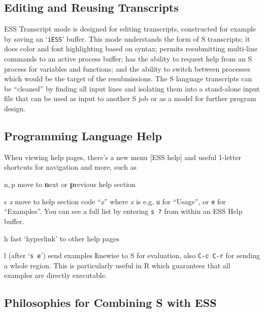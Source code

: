 \documentclass{article}
\newcommand{\stexttt}[1]{{\small\texttt{#1}}}
\newcommand{\file}[1]{`\stexttt{#1}'}
\begin{document}
\subsection{Editing and Reusing Transcripts}
\label{sec:S:trans}

ESS Transcript mode is designed for editing transcripts, constructed for
example by saving an \file{iESS} buffer.  This mode understands the form
of S transcripts; it does color and font highlighting based on syntax;
permits resubmitting multi-line commands to an active process buffer;
has the ability to request help from an S process for variables and
functions; and the ability to switch between processes which would be
the target of the resubmissions.  The S language transcripts can be
``cleaned'' by finding all input lines and isolating them into a
stand-alone input file that can be used as input to another S job or as
a model for further program design.

\subsection{Programming Language Help}
\label{sec:S:help}

When viewing help pages, there's a new menu \textsf{[ESS help]} and
useful 1-letter shortcuts for navigation and more, such as
\begin{list}{}{\renewcommand{\makelabel}[1]{\bf#1\hfill}}
 \item[n,\,p] move to \textbf{n}ext or \textbf{p}revious help section
 \item[{s \textit{x}}] move to help section code ``\textit{x}'' where
  \textit{x} is e.g. \stexttt{u} for ``Usage'', or \stexttt{e} for
  ``Examples''.  You can see a full list by entering \stexttt{s ?} from
  within an ESS Help buffer.
 \item[h] fast `hyperlink' to other help pages
 \item[l] (after `\stexttt{s e}') send examples \textbf{l}inewise to S
  for evaluation, also \stexttt{C-c C-r} for sending a whole region.
  This is particularly useful in R which guarantees that all examples
  are directly executable.
\end{list}

\subsection{Philosophies for Combining S with ESS}
\label{sec:S:philosophy}
\end{document}
